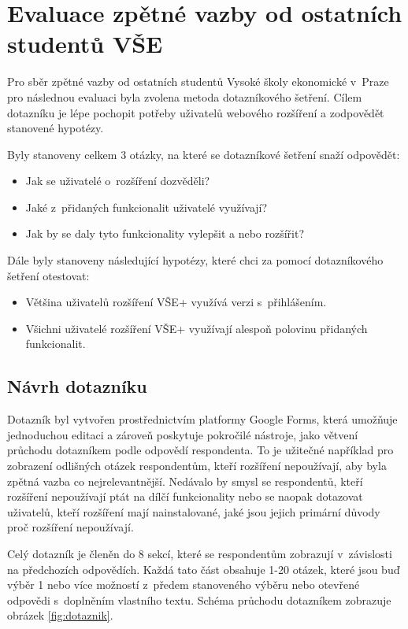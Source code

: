 \chapter{Evaluace zpětné vazby od ostatních studentů VŠE}\label{chap:zpetna-vazba}

Pro sběr zpětné vazby od ostatních studentů Vysoké školy ekonomické v~Praze pro následnou evaluaci byla zvolena metoda dotazníkového šetření. Cílem dotazníku je lépe pochopit potřeby uživatelů webového rozšíření a zodpovědět stanovené hypotézy.

Byly stanoveny celkem 3 otázky, na které se dotazníkové šetření snaží odpovědět:

\begin{itemize}
    \item Jak se uživatelé o~rozšíření dozvěděli?
    \item Jaké z~přidaných funkcionalit uživatelé využívají?
    \item Jak by se daly tyto funkcionality vylepšit a nebo rozšířit?
\end{itemize}

Dále byly stanoveny následující hypotézy, které chci za pomocí dotazníkového šetření otestovat:

\begin{itemize}
    \item Většina uživatelů rozšíření VŠE+ využívá verzi s~přihlášením.
    \item Všichni uživatelé rozšíření VŠE+ využívají alespoň polovinu přidaných funkcionalit.
\end{itemize}

\section{Návrh dotazníku}

Dotazník byl vytvořen prostřednictvím platformy Google Forms, která umožňuje jednoduchou editaci a zároveň poskytuje pokročilé nástroje, jako větvení průchodu dotazníkem podle odpovědí respondenta. To je užitečné například pro zobrazení odlišných otázek respondentům, kteří rozšíření nepoužívají, aby byla zpětná vazba co nejrelevantnější. Nedávalo by smysl se respondentů, kteří rozšíření nepoužívají ptát na dílčí funkcionality nebo se naopak dotazovat uživatelů, kteří rozšíření mají nainstalované, jaké jsou jejich primární důvody proč rozšíření nepoužívají. 

Celý dotazník je členěn do 8 sekcí, které se respondentům zobrazují v~závislosti na předchozích odpovědích. Každá tato část obsahuje 1-20 otázek, které jsou buď výběr 1 nebo více možností z~předem stanoveného výběru nebo otevřené odpovědi s~doplněním vlastního textu. Schéma průchodu dotazníkem zobrazuje obrázek \ref{fig:dotaznik}.

